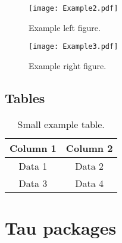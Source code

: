 \documentclass[9pt,a4paper,twoside]{tau-class/tau}
\begin{document}
		
        \begin{figure*}[tp] %
		\centering
		  \begin{subfigure}[b]{0.38\linewidth} %
			\texttt{[image: Example2.pdf]}
			\caption{Example left figure.}
			\label{fig:figa}
		\end{subfigure}
			\hspace{20pt}   %
		\begin{subfigure}[b]{0.375\linewidth} %
			\texttt{[image: Example3.pdf]}
			\caption{Example right figure.}
			\label{fig:figb}
		\end{subfigure}
		\label{fig:examplefloat}
	\end{figure*}
	
    \subsection{Tables}
	
		
	\begin{table}[H]
		\centering
		\caption{Small example table.}
		\label{tab:table}
		\begin{tabular}{cc}
			\toprule
			\textbf{Column 1} & \textbf{Column 2} \\
			\midrule
			Data 1 & Data 2 \\
			Data 3 & Data 4 \\
			\bottomrule
		\end{tabular}
			
			
	\end{table}
		
\section{Tau packages}
\end{document}
